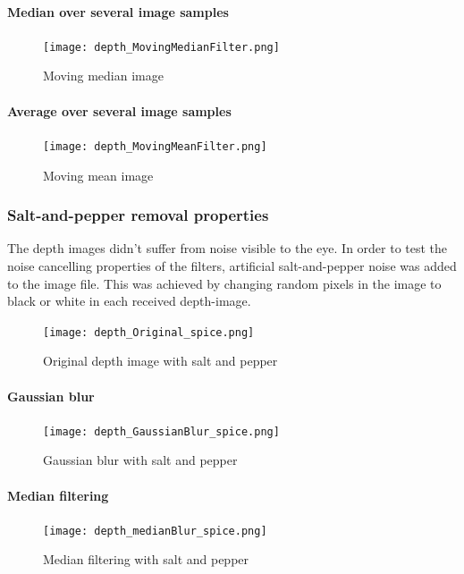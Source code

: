 \documentclass[DIV12,a4paper]{scrartcl}
\begin{document}
\paragraph{Median over several image samples}
\begin{figure}[!htbp]
  \centering
  \texttt{[image: depth\_MovingMedianFilter.png]}
  \caption{Moving median image}
  \label{fig:moving_median_depth}
\end{figure}
\paragraph{Average over several image samples}
\begin{figure}[!htbp]
  \centering
  \texttt{[image: depth\_MovingMeanFilter.png]}
  \caption{Moving mean image}
  \label{fig:moving_mean_depth}
\end{figure}
\subsubsection{Salt-and-pepper removal properties}
\label{sec:grain_removal}
The depth images didn't suffer from noise visible to the eye. In order to test the noise cancelling properties of the filters, artificial salt-and-pepper noise was added to the image file. This was achieved by changing random pixels in the image to black or white in each received depth-image. %
\par
\begin{figure}[!htbp]
  \centering
  \texttt{[image: depth\_Original\_spice.png]}
  \caption{Original depth image with salt and pepper}
  \label{fig:original_depth_spice}
\end{figure}
\paragraph{Gaussian blur}
\begin{figure}[!htbp]
  \centering
  \texttt{[image: depth\_GaussianBlur\_spice.png]}
  \caption{Gaussian blur with salt and pepper}
  \label{fig:gaussian_blur}
\end{figure}
\paragraph{Median filtering}
\begin{figure}[!htbp]
  \centering
  \texttt{[image: depth\_medianBlur\_spice.png]}
  \caption{Median filtering with salt and pepper}
  \label{fig:median_depth_spice}
\end{figure}
\end{document}
